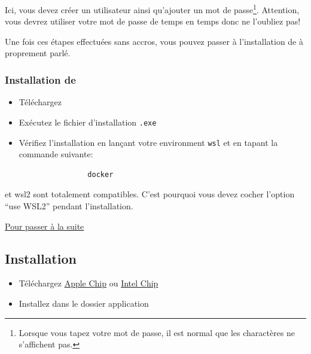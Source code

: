 \documentclass[internal]{nhitec_design}
\begin{document}
        Ici, vous devez créer un utilisateur ainsi qu'ajouter un mot de passe\footnote{Lorsque vous tapez votre mot de passe, il est normal que les charactères ne s'affichent pas.}. Attention, vous devrez utiliser votre mot de passe de temps en temps donc ne l'oubliez pas!

        Une fois ces étapes effectuées sans accros, vous pouvez passer à l'installation de \dockerdesktop à proprement parlé.

        \subsubsection[Installation de Docker Desktop]{Installation de \dockerdesktop}
        
        \begin{itemize}
            \item[1.] Téléchargez \href{https://desktop.docker.com/win/main/amd64/Docker%20Desktop%20Installer.exe}{\dockerdesktop{}}
            
            \item[2.] Exécutez le fichier d'installation \verb|.exe|
            
            \item[3.] Vérifiez l'installation en lançant votre environment \verb|wsl| et en tapant la commande suivante:
            \begin{lstlisting}
                docker
            \end{lstlisting}
        \end{itemize}

        \docker{} et wsl2 sont totalement compatibles. C'est pourquoi vous devez cocher l'option ``use WSL2'' pendant l'installation. 

        \hyperref[sec:suite]{Pour passer à la suite}

    \newpage
    \subsection[Installation MacOS]{Installation \macos{}\label{sec:installation_macos}}

        \begin{itemize}
            \item[1.] Téléchargez \dockerdesktop{} \href{https://desktop.docker.com/mac/main/arm64/Docker.dmg?utm_source=docker&utm_medium=webreferral&utm_campaign=dd-smartbutton&utm_location=module}{Apple Chip} ou \href{https://desktop.docker.com/mac/main/amd64/Docker.dmg?utm_source=docker&utm_medium=webreferral&utm_campaign=dd-smartbutton&utm_location=module}{Intel Chip}
            \item[2.] Installez \dockerdesktop{} dans le dossier application
        \end{itemize}
\end{document}
